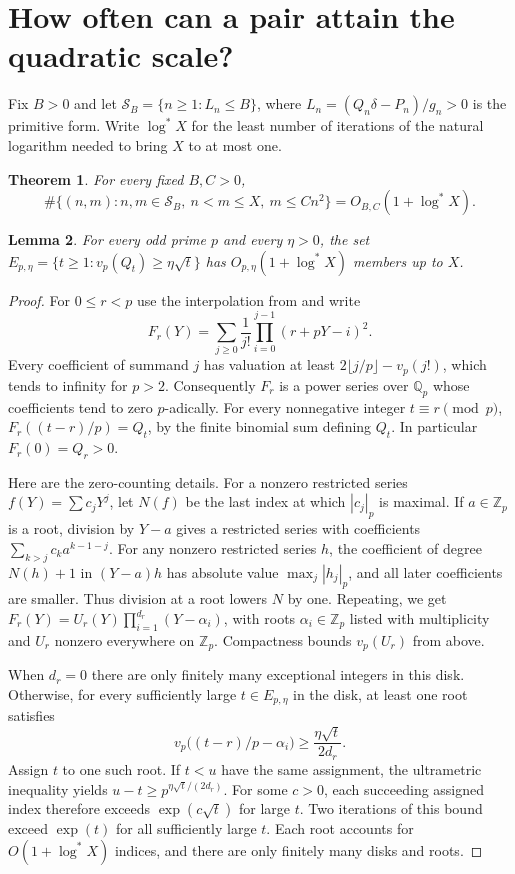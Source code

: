 \documentclass[11pt,a4paper,oneside,openany]{report}
\newtheorem{theorem}{Theorem}[section]
\newtheorem{lemma}[theorem]{Lemma}\newtheorem{proposition}[theorem]{Proposition}
\theoremstyle{remark}\newtheorem{remark}[theorem]{Remark}
\numberwithin{equation}{section}
\begin{document}
\section{How often can a pair attain the quadratic scale?}

Fix $B>0$ and let $\mathcal S_B=\{n\ge1:L_n\le B\}$, where
$L_n=(Q_n\delta-P_n)/g_n>0$ is the primitive form. Write
$\log^* X$ for the least number of iterations of the natural logarithm
needed to bring $X$ to at most one.

\begin{theorem}\label{ch1:thm:thin-quad}
For every fixed $B,C>0$,
\[
 \#\{(n,m):n,m\in\mathcal S_B,\ n<m\le X,\ m\le Cn^2\}
       =O_{B,C}(1+\log^* X).
\]
\end{theorem}

\begin{lemma}\label{ch1:lem:thin-spike}
For every odd prime $p$ and every $\eta>0$, the set
$E_{p,\eta}=\{t\ge1:v_p(Q_t)\ge\eta\sqrt t\}$ has
$O_{p,\eta}(1+\log^* X)$ members up to $X$.
\end{lemma}
\begin{proof}
For $0\le r<p$ use the interpolation from \cite{vm30} and write
\[
 F_r(Y)=\sum_{j\ge0}\frac1{j!}
       \prod_{i=0}^{j-1}(r+pY-i)^2.
\]
Every coefficient of summand $j$ has valuation at least
$2\lfloor j/p\rfloor-v_p(j!)$, which tends to infinity for $p>2$.
Consequently $F_r$ is a power series over $\mathbb Q_p$ whose coefficients
tend to zero $p$-adically. For every nonnegative integer $t\equiv r\pmod p$,
$F_r((t-r)/p)=Q_t$, by the finite binomial sum defining $Q_t$. In
particular $F_r(0)=Q_r>0$.

Here are the zero-counting details. For a nonzero restricted series
$f(Y)=\sum c_jY^j$, let $N(f)$ be the last index at which $|c_j|_p$
is maximal. If $a\in\mathbb Z_p$ is a root, division by $Y-a$ gives a
restricted series with coefficients
$\sum_{k>j}c_k a^{k-1-j}$. For any nonzero restricted series $h$,
the coefficient of degree $N(h)+1$ in $(Y-a)h$ has absolute value
$\max_j|h_j|_p$, and all later coefficients are smaller. Thus division
at a root lowers $N$ by one. Repeating, we get
$F_r(Y)=U_r(Y)\prod_{i=1}^{d_r}(Y-\alpha_i)$, with roots
$\alpha_i\in\mathbb Z_p$ listed with multiplicity and $U_r$ nonzero
everywhere on $\mathbb Z_p$. Compactness bounds $v_p(U_r)$ from above.

When $d_r=0$ there are only finitely many exceptional integers in this
disk. Otherwise, for every sufficiently large $t\in E_{p,\eta}$ in
the disk, at least one root satisfies
\[
 v_p\big((t-r)/p-\alpha_i\big)\ge \frac{\eta\sqrt t}{2d_r}.
\]
Assign $t$ to one such root. If $t<u$ have the same assignment, the
ultrametric inequality yields $u-t\ge p^{\eta\sqrt t/(2d_r)}$.
For some $c>0$, each succeeding assigned index therefore exceeds
$\exp(c\sqrt t)$ for large $t$. Two iterations of this bound exceed
$\exp(t)$ for all sufficiently large $t$. Each root accounts for
$O(1+\log^*X)$ indices, and there are only finitely many disks and
roots.
\end{proof}
\end{document}
